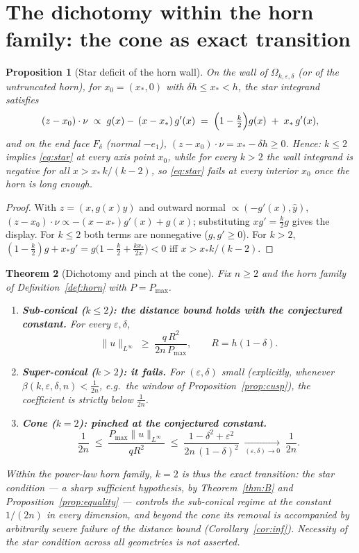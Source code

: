\documentclass[10pt]{article}
\newtheorem{theorem}{Theorem}[section]
\newtheorem{proposition}[theorem]{Proposition}
\theoremstyle{remark}
\newcommand{\Om}{\Omega}
\newcommand{\Pmax}{P_{\max}}
\newcommand{\norminf}[1]{\|#1\|_{L^\infty}}
\newcommand{\eps}{\varepsilon}
\begin{document}
\section{The dichotomy within the horn family: the cone as exact
transition}\label{sec:dichotomy}

\begin{proposition}[Star deficit of the horn wall]\label{prop:deficit}
On the wall of $\Om_{k,\eps,\delta}$ (or of the untruncated horn), for
$x_0=(x_*,0)$ with $\delta h\le x_*<h$, the star integrand satisfies
\[
(z-x_0)\cdot\nu\;\propto\;g(x)-\,(x-x_*)\,g'(x)
\;=\;\Bigl(1-\tfrac k2\Bigr)g(x)\;+\;x_*\,g'(x),
\]
and on the end face $F_\delta$ (normal $-e_1$),
$(z-x_0)\cdot\nu=x_*-\delta h\ge0$. Hence:
$k\le 2$ implies \eqref{eq:star} at every axis point $x_0$, while for every
$k>2$ the wall integrand is negative for all
$x>x_*\,k/(k-2)$, so \eqref{eq:star} fails at every interior $x_0$ once the
horn is long enough.
\end{proposition}

\begin{proof}
With $z=(x,g(x)\hat y)$ and outward normal $\propto(-g'(x),\hat y)$,
$(z-x_0)\cdot\nu\propto -(x-x_*)g'(x)+g(x)$; substituting
$xg'=\tfrac k2 g$ gives the display. For $k\le2$ both terms are nonnegative
($g,g'\ge0$). For $k>2$,
$(1-\tfrac k2)g+x_*g'=g\bigl(1-\tfrac k2+\tfrac{k x_*}{2x}\bigr)<0$ iff
$x>x_*k/(k-2)$.
\end{proof}

\begin{theorem}[Dichotomy and pinch at the cone]\label{thm:dichotomy}
Fix $n\ge2$ and the horn family of Definition~\ref{def:horn} with $P=\Pmax$.
\begin{enumerate}
\item[\emph{(i)}] \textbf{Sub-conical ($k\le2$): the distance bound holds with
the conjectured constant.} For every $\eps,\delta$,
\[
\norminf{u}\;\ge\;\frac{q\,R^2}{2n\,\Pmax},\qquad R=h(1-\delta).
\]
\item[\emph{(ii)}] \textbf{Super-conical ($k>2$): it fails.} For
$(\eps,\delta)$ small (explicitly, whenever
$\beta(k,\eps,\delta,n)<\tfrac1{2n}$, e.g.\ the window of
Proposition~\ref{prop:cusp}), the coefficient is strictly below
$\tfrac1{2n}$.
\item[\emph{(iii)}] \textbf{Cone ($k=2$): pinched at the conjectured constant.}
\[
\frac1{2n}\;\le\;\frac{\Pmax\norminf{u}}{qR^2}
\;\le\;\frac{1-\delta^2+\eps^2}{2n\,(1-\delta)^2}
\;\xrightarrow[(\eps,\delta)\to0]{}\;\frac1{2n}.
\]
\end{enumerate}
Within the power-law horn family, $k=2$ is thus the exact transition: the
star condition --- a sharp \emph{sufficient} hypothesis, by
Theorem~\ref{thm:B} and Proposition~\ref{prop:equality} --- controls the
sub-conical regime at the constant $1/(2n)$ in every dimension, and beyond the
cone its removal is accompanied by arbitrarily severe failure of the distance
bound (Corollary~\ref{cor:inf}). Necessity of the star condition across all
geometries is not asserted.
\end{theorem}
\end{document}
